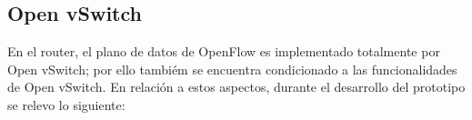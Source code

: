 
 
\subsection{Open vSwitch}

En el router, el plano de datos de OpenFlow es implementado totalmente por Open vSwitch; por ello tambi\'em se encuentra condicionado a las funcionalidades de Open vSwitch. En relaci\'on a estos aspectos, durante el desarrollo del prototipo se relevo lo siguiente:

